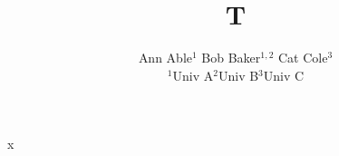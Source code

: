 \documentclass{article}
\begin{document}
\title{T}
\author{Ann Able$^{1}${\quad} Bob Baker$^{1,2}${\quad} Cat Cole$^{3}$ \\
$^{1}$Univ A{\quad}$^{2}$Univ B{\quad}$^{3}$Univ C}
\maketitle
x
\end{document}
